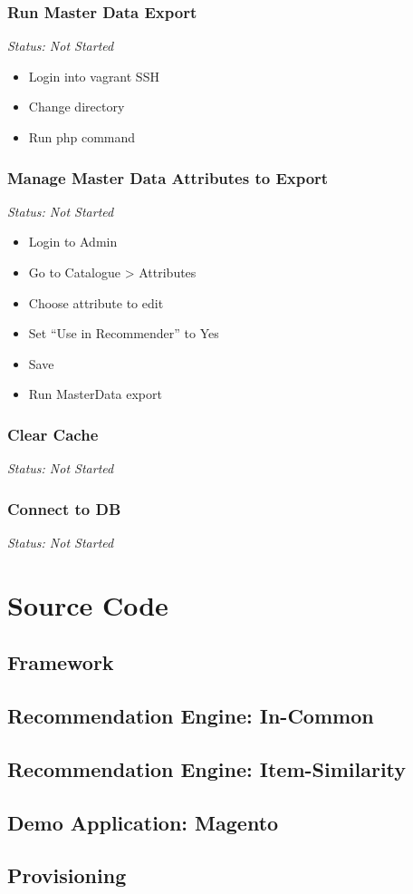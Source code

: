 \subsubsection{Run Master Data Export}

\emph{Status: Not Started}

\begin{itemize}
\item Login into vagrant SSH
\item Change directory
\item Run php command
\end{itemize}

\subsubsection{Manage Master Data Attributes to Export}

\emph{Status: Not Started}

\begin{itemize}
\item Login to Admin
\item Go to Catalogue > Attributes
\item Choose attribute to edit
\item Set ``Use in Recommender'' to Yes
\item Save
\item Run MasterData export
\end{itemize}

\subsubsection{Clear Cache}

\emph{Status: Not Started}

\subsubsection{Connect to DB}

\emph{Status: Not Started}


\section{Source Code}

\subsection{Framework}

\subsection{Recommendation Engine: In-Common}

\subsection{Recommendation Engine: Item-Similarity}

\subsection{Demo Application: Magento}

\subsection{Provisioning}